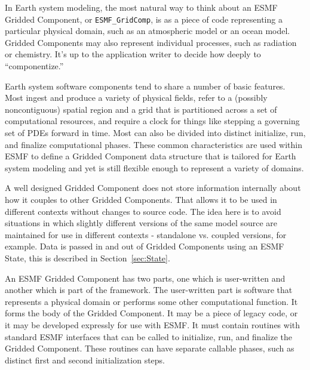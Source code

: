%

\label{sec:GridComp}

In Earth system modeling, the most natural way to think about an ESMF 
Gridded Component, or {\tt ESMF\_GridComp}, is as a piece of code 
representing a particular physical domain, such as an atmospheric 
model or an ocean model.  Gridded Components may also represent individual
processes, such as radiation or chemistry.  It's up to the application
writer to decide how deeply to ``componentize.''

Earth system software components tend to share a number of basic 
features.  Most ingest and produce a variety of physical fields, refer to 
a (possibly noncontiguous) spatial region and a grid that is 
partitioned across a set of computational resources, and require 
a clock for things like stepping a governing set of PDEs forward in time.  
Most can also be divided into distinct initialize, run, and finalize 
computational phases.  These common characteristics are used 
within ESMF to define a Gridded Component data structure that 
is tailored for Earth system modeling and yet is still flexible
enough to represent a variety of domains.

A well designed Gridded Component does not store information 
internally about how it couples to other Gridded Components.  That
allows it to be used in different contexts without changes to source
code.  The idea here is to avoid situations in which slightly
different versions of the same model source are maintained for use in 
different contexts - standalone vs. coupled versions, for example.
Data is passed in and out of Gridded Components using an ESMF State,
this is described in Section~\ref{sec:State}.

An ESMF Gridded Component has two parts, one which is user-written
and another which is part of the framework.  The user-written
part is software that represents a physical domain or performs some
other computational function.  It forms the body of the Gridded 
Component.  It may be a piece of legacy code, or it may be developed 
expressly for use with ESMF.  It must contain routines with
standard ESMF interfaces that can be called to initialize, run, and
finalize the Gridded Component.  These routines can have separate 
callable phases, such as distinct first and second initialization steps.

